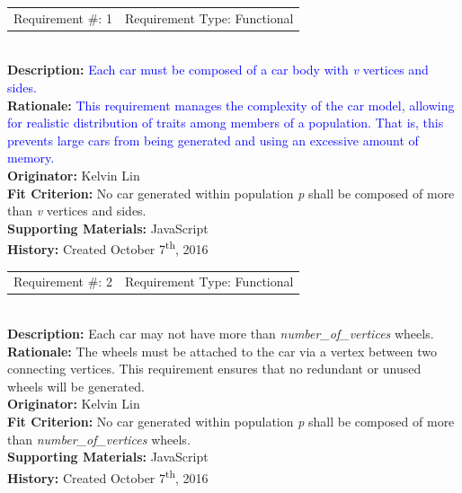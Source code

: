 \documentclass[12pt, titlepage]{article}
\begin{document}
\begin{reqbox}
	\begin{tabular}{cc}
		Requirement \#: 1 & Requirement Type: Functional \\
	\end{tabular} \\
	\textbf{Description:} \textcolor{blue}{Each car must be composed of a car body 
with \textit{v} vertices and sides.} 
	\\
	\textbf{Rationale:}  \textcolor{blue}{This requirement manages the complexity 
of the car model, 
	allowing for realistic distribution of traits among members of a population. 
	That is, this prevents large cars from being generated and using an excessive 
	amount of memory.} \\
	\textbf{Originator:} Kelvin Lin\\
	\textbf{Fit Criterion:} No car generated within population \textit{p} shall be 
	composed of more than \textit{v} vertices and sides.\\
	\textbf{Supporting Materials:} JavaScript \\
	\textbf{History:} Created October 7\textsuperscript{th}, 2016
\end{reqbox}

\newpage

\begin{reqbox}
	\begin{tabular}{cc}
		Requirement \#: 2 & Requirement Type: Functional \\
	\end{tabular} \\
	\textbf{Description:} Each car may not have more than 
	\textit{number\_of\_vertices} wheels. \\
	\textbf{Rationale:}  The wheels must be attached to the car via a vertex 
between 
	two connecting vertices. This requirement ensures that no redundant or unused 
	wheels will be generated.\\
	\textbf{Originator:} Kelvin Lin\\
	\textbf{Fit Criterion:} No car generated within population \textit{p} shall be 
	composed of more than \textit{number\_of\_vertices} wheels.\\
	\textbf{Supporting Materials:} JavaScript \\
	\textbf{History:} Created October 7\textsuperscript{th}, 2016
\end{reqbox}
\end{document}

